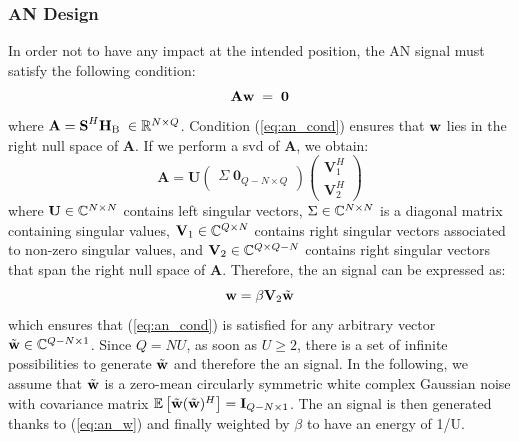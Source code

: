  


\subsubsection{AN Design}
In order not to have any impact at the intended position, the AN signal must satisfy the following condition:
\begin{equation}
    \textbf{A} \textbf{w} \; = \; \textbf{0}
    \label{eq:an_cond}
\end{equation}
where $\textbf{A} = \textbf{S}^H\textbf{H}_{\text{B}}\; \in \mathbb{R}^{N\times Q}$. Condition (\ref{eq:an_cond}) ensures that $\textbf{w}$ lies in the right null space of $\textbf{A}$. If we perform a \gls{svd} of $\textbf{A}$, we obtain:
\begin{equation}
    \textbf{A} = \textbf{U} 
    \begin{pmatrix}
    \Sigma \; \textbf{0}_{Q-N\times Q}
    \end{pmatrix}
    \begin{pmatrix}
    \textbf{V}_1^H \\
    \textbf{V}_2^H
    \end{pmatrix}
    \label{eq:an_svd}
\end{equation}
where $\textbf{U} \in \mathbb{C}^{N \times N}$ contains left singular vectors, $\Sigma \in \mathbb{C}^{N \times N}$ is a diagonal matrix containing singular values, $\textbf{V}_1 \in \mathbb{C}^{Q \times N}$ contains right singular vectors associated to non-zero singular values, and $\textbf{V}_2 \in \mathbb{C}^{Q \times Q-N}$ contains right singular vectors that span the right null space of $\textbf{A}$. Therefore, the \gls{an} signal can be expressed as:
\begin{equation}
    \textbf{w} = \beta \textbf{V}_2 \tilde{\textbf{w}}
    \label{eq:an_w}
\end{equation}
which ensures that (\ref{eq:an_cond}) is satisfied for any arbitrary vector $\tilde{\textbf{w}} \in \mathbb{C}^{Q-N \times 1}$. Since $Q = NU$, as soon as $U\geq 2$, there is a set of infinite possibilities to generate $\tilde{\textbf{w}}$ and therefore the \gls{an} signal. In the following, we assume that $\tilde{\textbf{w}}$ is a zero-mean circularly symmetric white complex Gaussian noise with covariance matrix $\mathbb{E} \left[\tilde{\textbf{w}}(\tilde{\textbf{w}})^H\right] = \textbf{I}_{Q-N \times 1}$. The \gls{an} signal is then generated thanks to (\ref{eq:an_w}) and finally weighted by $\beta$ to have an energy of 1/U.


